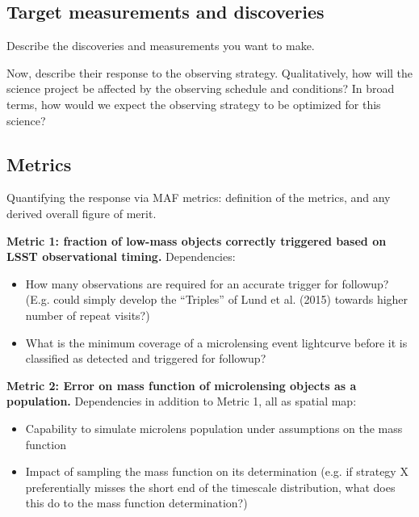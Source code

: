 
\subsection{Target measurements and discoveries}
\label{sec:keyword:targets}

Describe the discoveries and measurements you want to make.

Now, describe their response to the observing strategy. Qualitatively,
how will the science project be affected by the observing schedule and
conditions? In broad terms, how would we expect the observing strategy
to be optimized for this science?



\subsection{Metrics}
\label{sec:keyword:metrics}

Quantifying the response via MAF metrics: definition of the metrics,
and any derived overall figure of merit.

{\bf Metric 1: fraction of low-mass objects correctly triggered based
  on LSST observational timing.} Dependencies:
\begin{itemize}
  \item How many observations are required for an accurate trigger for followup? (E.g. could simply develop the ``Triples'' of Lund et al. (2015) towards higher number of repeat visits?) 
\item What is the minimum coverage of a microlensing event lightcurve before it is classified as detected and triggered for followup? 
\end{itemize}

{\bf Metric 2: Error on mass function of microlensing objects as a population.} Dependencies in addition to Metric 1, all as spatial map:
\begin{itemize}
  \item Capability to simulate microlens population under assumptions on the mass function
  \item Impact of sampling the mass function on its determination (e.g. if strategy X preferentially misses the short end of the timescale distribution, what does this do to the mass function determination?)
\end{itemize}



